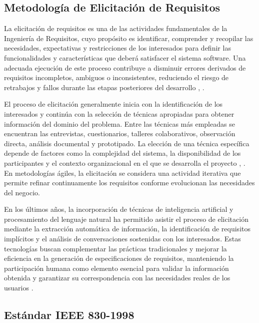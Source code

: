 \subsection{Metodología de Elicitación de Requisitos}

La elicitación de requisitos es una de las actividades fundamentales de la Ingeniería de Requisitos, cuyo propósito es identificar, comprender 
y recopilar las necesidades, expectativas y restricciones de los interesados para definir las funcionalidades y características que deberá 
satisfacer el sistema software. Una adecuada ejecución de este proceso contribuye a disminuir errores derivados de requisitos incompletos, 
ambiguos o inconsistentes, reduciendo el riesgo de retrabajos y fallos durante las etapas posteriores del desarrollo \cite{Akhtar2025}, \cite{Umar2024}.

El proceso de elicitación generalmente inicia con la identificación de los interesados y continúa con la selección de técnicas apropiadas para obtener 
información del dominio del problema. Entre las técnicas más empleadas se encuentran las entrevistas, cuestionarios, talleres colaborativos, observación 
directa, análisis documental y prototipado. La elección de una técnica específica depende de factores como la complejidad del sistema, la disponibilidad 
de los participantes y el contexto organizacional en el que se desarrolla el proyecto \cite{Akhtar2025}, \cite{canedo2022guidelines}. En metodologías ágiles, la elicitación se considera una 
actividad iterativa que permite refinar continuamente los requisitos conforme evolucionan las necesidades del negocio.

En los últimos años, la incorporación de técnicas de inteligencia artificial y procesamiento del lenguaje natural ha permitido asistir el proceso 
de elicitación mediante la extracción automática de información, la identificación de requisitos implícitos y el análisis de conversaciones sostenidas 
con los interesados. Estas tecnologías buscan complementar las prácticas tradicionales y mejorar la eficiencia en la generación de especificaciones de 
requisitos, manteniendo la participación humana como elemento esencial para validar la información obtenida y garantizar su correspondencia con las 
necesidades reales de los usuarios \cite{Umar2024}.

\subsection{Estándar IEEE 830-1998}

